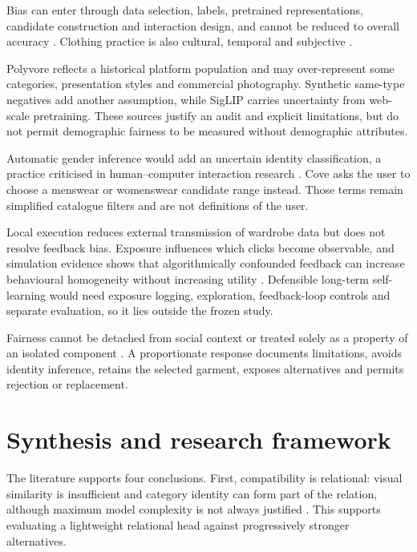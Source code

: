 Bias can enter through data selection, labels, pretrained representations,
candidate construction and interaction design, and cannot be reduced to
overall accuracy \parencite{mehrabi2021bias}. Clothing practice is also
cultural, temporal and subjective \parencite{deldjoo2023review}.

Polyvore reflects a historical platform population and may over-represent some
categories, presentation styles and commercial photography. Synthetic
same-type negatives add another assumption, while SigLIP carries uncertainty
from web-scale pretraining. These sources justify an audit and explicit
limitations, but do not permit demographic fairness to be measured without
demographic attributes.

Automatic gender inference would add an uncertain identity classification, a
practice criticised in human--computer interaction research
\parencite{keyes2018misgendering}. Cove asks the user to choose a menswear or
womenswear candidate range instead. Those terms remain simplified catalogue
filters and are not definitions of the user.

Local execution reduces external transmission of wardrobe data but does not
resolve feedback bias. Exposure influences which clicks become observable, and
simulation evidence shows that algorithmically confounded feedback can
increase behavioural homogeneity without increasing utility
\parencite{chaney2018confounding}. Defensible long-term self-learning would
need exposure logging, exploration, feedback-loop controls and separate
evaluation, so it lies outside the frozen study.

Fairness cannot be detached from social context or treated solely as a property
of an isolated component \parencite{selbst2019fairness}. A proportionate
response documents limitations, avoids identity inference, retains the
selected garment, exposes alternatives and permits rejection or replacement.

\section{Synthesis and research framework}

The literature supports four conclusions. First, compatibility is relational:
visual similarity is insufficient and category identity can form part of the
relation, although maximum model complexity is not always justified
\parencite{mcauley2015styles,vasileva2018typeaware,sarkar2023outfittransformer}.
This supports evaluating a lightweight relational head against progressively
stronger alternatives.

